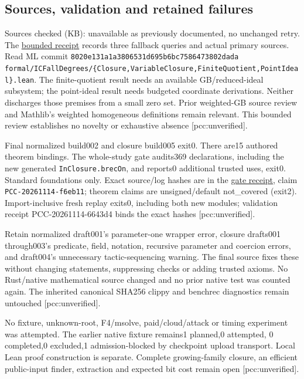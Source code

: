 \documentclass[
  10pt,
]{article}
\begin{document}
\subsection{Sources, validation and retained
failures}\label{sources-validation-and-retained-failures}

Sources checked (KB): unavailable as previously documented, no unchanged
retry. The
\href{../target-grading-evidence/prior-search-receipt.json}{bounded
receipt} records three fallback queries and actual primary sources. Read
ML commit \texttt{8020e131a1a3806531d695b6bc7586473802dada}
\texttt{formal/ICFallDegrees/\{Closure,VariableClosure,FiniteQuotient,PointIdeal\}.lean}.
The finite-quotient result needs an available GB/reduced-ideal
subsystem; the point-ideal result needs budgeted coordinate derivations.
Neither discharges those premises from a small zero set. Prior
weighted-GB source review and Mathlib's weighted homogeneous definitions
remain relevant. This bounded review establishes no novelty or
exhaustive absence {[}pcc:unverified{]}.

Final normalized build002 and closure build005 exit0. There are15
authored theorem bindings. The whole-study gate audits369 declarations,
including the new generated \texttt{InClosure.brecOn}, and reports0
additional trusted uses, exit0. Standard foundations only. Exact
source/log hashes are in the
\href{../target-grading-evidence/gate-build-001.json}{gate receipt},
claim \texttt{PCC-20261114-f6eb11}; theorem claims are unsigned/default
not\_covered (exit2). Import-inclusive fresh replay exits0, including
both new modules; validation receipt PCC-20261114-6643d4 binds the exact
hashes {[}pcc:unverified{]}.

Retain normalized draft001's parameter-one wrapper error, closure
drafts001 through003's predicate, field, notation, recursive parameter
and coercion errors, and draft004's unnecessary tactic-sequencing
warning. The final source fixes these without changing statements,
suppressing checks or adding trusted axioms. No Rust/native mathematical
source changed and no prior native test was counted again. The inherited
canonical SHA256 clippy and benchrec diagnostics remain untouched
{[}pcc:unverified{]}.

No fixture, unknown-root, F4/msolve, paid/cloud/attack or timing
experiment was attempted. The earlier native fixture remains1 planned,0
attempted, 0 completed,0 excluded,1 admission-blocked by checkpoint
upload transport. Local Lean proof construction is separate. Complete
growing-family closure, an efficient public-input finder, extraction and
expected bit cost remain open {[}pcc:unverified{]}.
\end{document}
